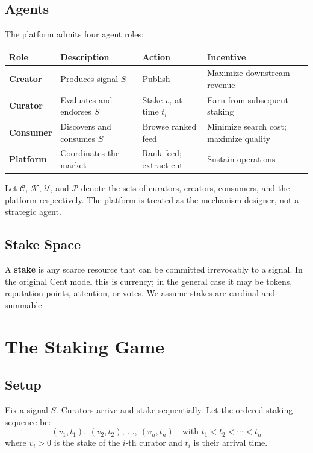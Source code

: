 \documentclass[12pt]{article}
\begin{document}
\subsection{Agents}

The platform admits four agent roles:

\begin{center}
\begin{tabular}{>{\bfseries}l l l l}
\toprule
Role & Description & Action & Incentive \\
\midrule
Creator & Produces signal $S$ & Publish & Maximize downstream revenue \\
Curator & Evaluates and endorses $S$ & Stake $v_i$ at time $t_i$ & Earn from subsequent staking \\
Consumer & Discovers and consumes $S$ & Browse ranked feed & Minimize search cost; maximize quality \\
Platform & Coordinates the market & Rank feed; extract cut & Sustain operations \\
\bottomrule
\end{tabular}
\end{center}

Let $\mathcal{C}$, $\mathcal{K}$, $\mathcal{U}$, and $\mathcal{P}$ denote the sets of curators, creators, consumers, and the platform respectively. The platform is treated as the mechanism designer, not a strategic agent.

\subsection{Stake Space}

A \textbf{stake} is any scarce resource that can be committed irrevocably to a signal. In the original Cent model this is currency; in the general case it may be tokens, reputation points, attention, or votes. We assume stakes are cardinal and summable.

\section{The Staking Game}

\subsection{Setup}

Fix a signal $S$. Curators arrive and stake sequentially. Let the ordered staking sequence be:
\[
  (v_1, t_1),\ (v_2, t_2),\ \ldots,\ (v_n, t_n) \quad \text{with } t_1 < t_2 < \cdots < t_n
\]
where $v_i > 0$ is the stake of the $i$-th curator and $t_i$ is their arrival time.
\end{document}
